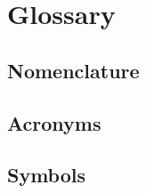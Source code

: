 \chapter{Glossary}\label{glossary}

\renewcommand{\glossarysection}[2][]{}
\renewcommand{\glsnamefont}[1]{\textbf{#1}}
\glsnoexpandfields  %


\section*{Nomenclature}\label{equipment}
\vspace{-30pt}
\glsaddall[types={nomenclature}]
\printglossary[type=nomenclature]


\section*{Acronyms}\label{acronyms}
\vspace{-30pt}
\glsaddall
\printglossary[type=\acronymtype]


\section*{Symbols}\label{symbols}
\vspace{-30pt}
\glsaddall
\printglossary[type=symbols]


\newpage